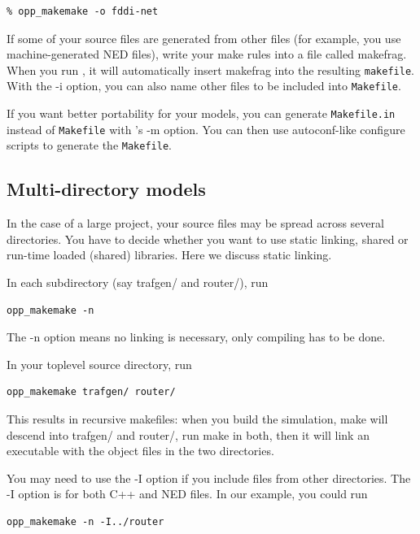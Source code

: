 \begin{verbatim}
% opp_makemake -o fddi-net
\end{verbatim}

If some of your source files are generated from other files (for
example, you use machine-generated NED files), write your make rules
into a file called makefrag. When you run , it
will automatically insert makefrag into the resulting \texttt{makefile}.  With
the -i option, you can also name other files to be included into
\texttt{Makefile}.


If you want better portability for your models, you can generate
\texttt{Makefile.in} instead of \texttt{Makefile} with 's -m
option. You can then use autoconf-like configure scripts to generate
the \texttt{Makefile}.




\subsection{Multi-directory models}

In the case of a large project, your source files may be spread across
several directories. You have to decide whether you want to use static
linking, shared or run-time loaded (shared)
libraries. Here we discuss static linking.


In each subdirectory (say trafgen/ and router/), run

\begin{verbatim}
opp_makemake -n
\end{verbatim}

The -n option means no linking is necessary, only compiling has
to be done.


In your toplevel source directory, run

\begin{verbatim}
opp_makemake trafgen/ router/
\end{verbatim}

This results in recursive makefiles: when you build the simulation, make
will descend into trafgen/ and router/, run make in both, then
it will link an executable with the object files in the two directories.


You may need to use the -I option if you include files from other
directories. The -I option is for both C++ and NED
files. In our example, you could run

\begin{verbatim}
opp_makemake -n -I../router
\end{verbatim}

